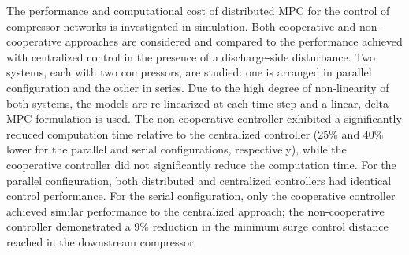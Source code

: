 The performance and computational cost of distributed MPC for the control of compressor networks is investigated in simulation.
Both cooperative and non-cooperative approaches are considered and compared to the performance achieved with centralized control in the presence of a discharge-side disturbance.
Two systems, each with two compressors, are studied: one is arranged in parallel configuration and the other in series.
Due to the high degree of non-linearity of both systems, the models are re-linearized at each time step and a linear, delta MPC formulation is used.
The non-cooperative controller exhibited a significantly reduced computation time relative to the centralized controller (25\% and 40\% lower for the parallel and serial configurations, respectively), while the cooperative controller did not significantly reduce the computation time.
For the parallel configuration, both distributed and centralized controllers had identical control performance.
For the serial configuration, only the cooperative controller achieved similar performance to the centralized approach; the non-cooperative controller demonstrated a 9\% reduction in the minimum surge control distance reached in the downstream compressor.
